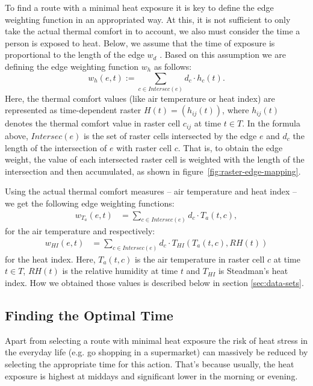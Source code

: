 To find a route with a minimal heat exposure it is key to define the edge weighting function in an appropriated way. At this, it is not sufficient to only take the actual thermal comfort in to account, we also must consider the time a person is exposed to heat. Below, we assume that the time of exposure is proportional to the length of the edge $w_d$ \parencite[following][]{Hasenfratz2015}. Based on this assumption we are defining the edge weighting function $w_h$ as follows: 
\begin{equation}\label{eq:edge-weight}
w_h(e, t) := \sum_{c \in Intersec(e)} d_c \cdot h_c(t).
\end{equation}
Here, the thermal comfort values (like air temperature or heat index) are represented as time-dependent raster $H(t) = \left(h_{ij}(t)\right)$, where $h_{ij}(t)$ denotes the thermal comfort value in raster cell $c_{ij}$ at time $t \in T$. In the formula above, $Intersec(e)$ is the set of raster cells intersected by the edge $e$ and $d_c$ the length of the intersection of $e$ with raster cell $c$.  That is, to obtain the edge weight, the value of each intersected raster cell is weighted with the length of the intersection and then accumulated, as shown in figure~\ref{fig:raster-edge-mapping}.

Using the actual thermal comfort measures -- air temperature and heat index -- we get the following edge weighting functions:
\begin{align}
	\label{eq:edge-weight-temperature}
	w_{T_a}(e,t)& = \sum_{c \in Intersec(e)} d_c \cdot T_a(t, c),
\end{align}
for the air temperature and respectively:
\begin{align}
	\label{eq:edge-weight-heatindex}
	w_{HI}(e,t)& = \sum_{c \in Intersec(e)} d_c \cdot T_{HI}\left(T_a(t, c), RH(t)\right)
\end{align}
for the heat index. Here, $T_a(t,c)$ is the air temperature in raster cell $c$ at time $t \in T$, $RH(t)$ is the relative humidity at time $t$ and $T_{HI}$ is Steadman's heat index. How we obtained those values is described below in section \ref{sec:data-sets}.

 \subsection{Finding the Optimal Time \label{sec:find-optimal-time}}
 
 Apart from selecting a route with minimal heat exposure the risk of heat stress in the everyday life (e.g. go shopping in a supermarket) can massively be reduced by selecting the appropriate time for this action. That's because usually, the heat exposure is highest at middays and significant lower in the morning or evening.
 
